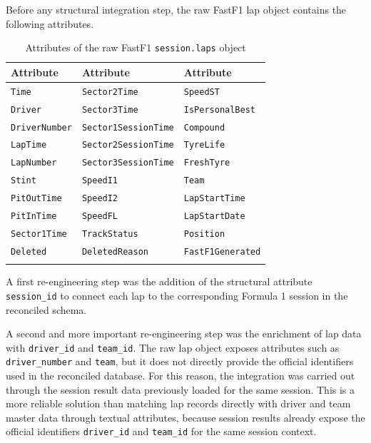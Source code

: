\documentclass[12pt,a4paper]{article}
\begin{document}
	Before any structural integration step, the raw FastF1 lap object contains the following attributes.
	
	\begin{table}[H]
		\centering
		\caption{Attributes of the raw FastF1 \texttt{session.laps} object}
		\renewcommand{\arraystretch}{1.15}
		\begin{tabularx}{\textwidth}{>{\raggedright\arraybackslash}X >{\raggedright\arraybackslash}X >{\raggedright\arraybackslash}X}
			\toprule
			\textbf{Attribute} & \textbf{Attribute} & \textbf{Attribute} \\
			\midrule
			\texttt{Time} & \texttt{Sector2Time} & \texttt{SpeedST} \\
			\texttt{Driver} & \texttt{Sector3Time} & \texttt{IsPersonalBest} \\
			\texttt{DriverNumber} & \texttt{Sector1SessionTime} & \texttt{Compound} \\
			\texttt{LapTime} & \texttt{Sector2SessionTime} & \texttt{TyreLife} \\
			\texttt{LapNumber} & \texttt{Sector3SessionTime} & \texttt{FreshTyre} \\
			\texttt{Stint} & \texttt{SpeedI1} & \texttt{Team} \\
			\texttt{PitOutTime} & \texttt{SpeedI2} & \texttt{LapStartTime} \\
			\texttt{PitInTime} & \texttt{SpeedFL} & \texttt{LapStartDate} \\
			\texttt{Sector1Time} & \texttt{TrackStatus} & \texttt{Position} \\
			\texttt{Deleted} & \texttt{DeletedReason} & \texttt{FastF1Generated} \\
			\multicolumn{3}{l}{\texttt{IsAccurate}} \\
			\bottomrule
		\end{tabularx}
	\end{table}
	
	A first re-engineering step was the addition of the structural attribute \texttt{session\_id} to connect each lap to the corresponding Formula 1 session in the reconciled schema.
	
	A second and more important re-engineering step was the enrichment of lap data with \texttt{driver\_id} and \texttt{team\_id}.
	The raw lap object exposes attributes such as \texttt{driver\_number} and \texttt{team}, but it does not directly provide the official identifiers used in the reconciled database.
	For this reason, the integration was carried out through the session result data previously loaded for the same session.
	This is a more reliable solution than matching lap records directly with driver and team master data through textual attributes, because session results already expose the official identifiers \texttt{driver\_id} and \texttt{team\_id} for the same session context.
	
\end{document}
